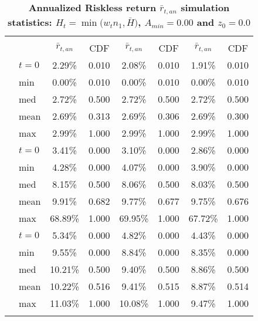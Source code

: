 \documentclass[letterpaper,12pt]{article}
\theoremstyle{definition}
\begin{document}
\begin{spacing}{1.5}
  \begin{table}[htbp]\centering\captionsetup{width=4.6in}
  \caption{\label{TabRiskl_A0}\textbf{Annualized Riskless return $\bar{r}_{t,an}$ simulation statistics: $H_t=\min\bigl(w_t n_1, \bar{H}\bigr)$, $A_{min}=0.00$ and $z_0=0.0$}}
    \begin{threeparttable}
    \begin{tabular}{>{\small}c >{\small}l| >{\small}c >{\small}c| >{\small}c >{\small}c| >{\small}c >{\small}c}
      \hline\hline
      & & \multicolumn{2}{c}{$k_{2,0}=0.11$} & \multicolumn{2}{c}{$k_{2,0}=0.14$} & \multicolumn{2}{c}{$k_{2,0}=0.17$} \\ \cline{3-8}
      & & $\bar{r}_{t,an}$ & CDF & $\bar{r}_{t,an}$ & CDF & $\bar{r}_{t,an}$ & CDF \\
      \hline
      \multirow{5}{*}{$\bar{H}=0.00$}
      & $t=0$ & 2.29\% & 0.010 & 2.08\% & 0.010 & 1.91\% & 0.010 \\
      & min & 0.00\% & 0.010 & 0.00\% & 0.010 & 0.00\% & 0.010 \\
      & med & 2.72\% & 0.500 & 2.72\% & 0.500 & 2.72\% & 0.500 \\
      & mean & 2.69\% & 0.313 & 2.69\% & 0.306 & 2.69\% & 0.300 \\
      & max & 2.99\% & 1.000 & 2.99\% & 1.000 & 2.99\% & 1.000 \\
      \hline
      \multirow{5}{*}{$\bar{H}=0.05$}
      & $t=0$ & 3.41\% & 0.000 & 3.10\% & 0.000 & 2.86\% & 0.000 \\
      & min & 4.28\% & 0.000 & 4.07\% & 0.000 & 3.90\% & 0.000 \\
      & med & 8.15\% & 0.500 & 8.06\% & 0.500 & 8.03\% & 0.500 \\
      & mean & 9.91\% & 0.682 & 9.77\% & 0.677 & 9.75\% & 0.676 \\
      & max & 68.89\% & 1.000 & 69.95\% & 1.000 & 67.72\% & 1.000 \\
      \hline
      \multirow{5}{*}{$\bar{H}=0.11$}
      & $t=0$ & 5.34\% & 0.000 & 4.82\% & 0.000 & 4.43\% & 0.000 \\
      & min & 9.55\% & 0.000 & 8.84\% & 0.000 & 8.35\% & 0.000 \\
      & med & 10.21\% & 0.500 & 9.40\% & 0.500 & 8.86\% & 0.500 \\
      & mean & 10.22\% & 0.516 & 9.41\% & 0.515 & 8.87\% & 0.514 \\
      & max & 11.03\% & 1.000 & 10.08\% & 1.000 & 9.47\% & 1.000 \\
      \hline
      \multirow{5}{*}{$\bar{H}=0.17$}

\end{tabular}
\end{threeparttable}
\end{table}
\end{spacing}
\end{document}
